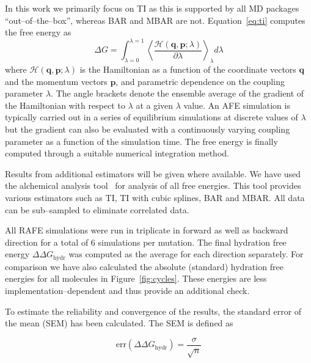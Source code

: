 \documentclass[journal=jctcce,manuscript=article]{achemso}
\renewcommand{\vec}[1]{\mathbf{#1}}
\begin{document}
In this work we primarily focus on TI as this is supported by all MD
packages ``out--of--the--box'', whereas BAR and MBAR are not.
Equation~\ref{eq:ti} computes the free energy as
\begin{equation}\label{eq:ti}
	\Delta G = \int_{\lambda=0}^{\lambda=1}
	\left\langle \frac{\mathscr{H}(\vec{q},\vec{p};\lambda)}{\partial\lambda}\right\rangle_\lambda d\lambda
\end{equation}
where $\mathscr{H}(\vec{q},\vec{p};\lambda)$ is the Hamiltonian as a function of the coordinate vectors $\vec{q}$ and the momentum vectors $\vec{p}$, and parametric dependence on the coupling parameter $\lambda$.  The angle brackets denote the ensemble average of the gradient of the Hamiltonian with respect to $\lambda$ at a given $\lambda$ value.  An AFE simulation is typically carried out in a series of equilibrium simulations at discrete values of $\lambda$ but the gradient can also be evaluated with a continuously varying coupling parameter as a function of the simulation time.  The free energy is finally computed through a suitable numerical integration method.

Results from additional estimators
will be given where available.  We have used the alchemical analysis
tool~\cite{klimovich_guidelines_2015} for analysis of all free energies.  This
tool provides various estimators such as TI, TI with cubic splines,
BAR and MBAR.  All data can be sub--sampled to eliminate correlated
data.

All RAFE simulations were run in triplicate in forward as well as
backward direction for a total of 6 simulations per mutation.  The
final hydration free energy $\Delta\Delta G_{\mathrm{hydr}}$ was
computed as the average for each direction separately.  For comparison we have 
also calculated the absolute (standard) hydration free energies for all
molecules in Figure~\ref{fig:cycles}.  These energies are less 
implementation--dependent and thus provide an additional check.

To estimate the reliability and convergence of the results, the
standard error of the mean (SEM) has been calculated.  The SEM is
defined as

\begin{equation}
  \label{eq:sem}
  \mathrm{err}(\Delta\Delta G_{\mathrm{hydr}}) = \frac{\sigma}{\sqrt{n}}
\end{equation}
\end{document}
